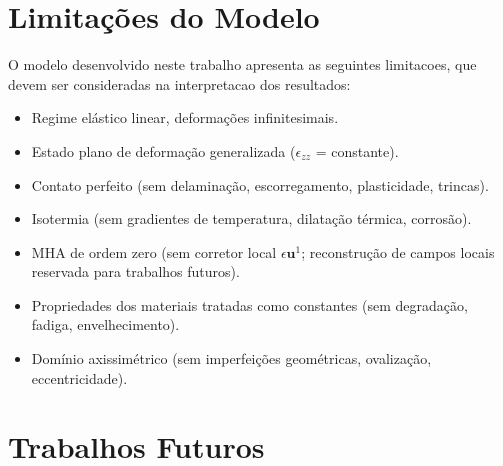
\section{Limitações do Modelo}\label{sec:conclusao_limitacoes}

O modelo desenvolvido neste trabalho apresenta as seguintes limitacoes, que devem ser consideradas na interpretacao dos resultados:
\begin{itemize}
\item Regime elástico linear, deformações infinitesimais.
\item Estado plano de deformação generalizada ($\epsilon_{zz}$ = constante).
\item Contato perfeito (sem delaminação, escorregamento, plasticidade, trincas).
\item Isotermia (sem gradientes de temperatura, dilatação térmica, corrosão).
\item MHA de ordem zero (sem corretor local $\epsilon \mathbf{u}^1$; reconstrução de campos locais reservada para trabalhos futuros).
\item Propriedades dos materiais tratadas como constantes (sem degradação, fadiga, envelhecimento).
\item Domínio axissimétrico (sem imperfeições geométricas, ovalização, eccentricidade).
\end{itemize}

\section{Trabalhos Futuros}\label{sec:conclusao_futuros}

